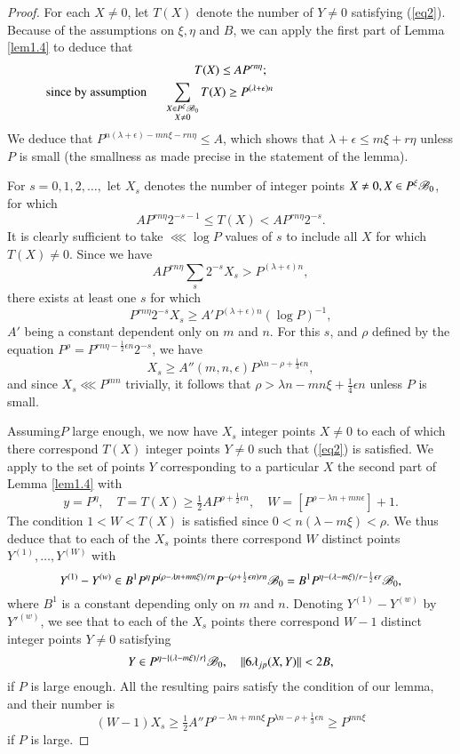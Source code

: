 \begin{proof}
For each $X\neq 0$, let $T(X)$ denote the number of $Y\neq 0$ 
satisfying (\ref{eq2}). Because of the assumptions on $\xi,\eta$ and 
$B$, we can apply the first part of Lemma \ref{lem1.4} to deduce that 
\begin{gather*}
T(X)\leq AP^{rn\eta};\\
\text{since by assumption}\hspace{.5cm} \sum_{\substack{X\in 
P^\xi\sB_0\\ X\neq 0}}T(X)\geq P^{(\lambda+\epsilon)n}\hspace{4cm}
\end{gather*}
We deduce that $P^{n(\lambda+\epsilon)-mn\xi-rn\eta}\leq A$, which 
shows that $\lambda+\epsilon\leq m\xi+r\eta$ unless $P$ is small (the 
smallness as made precise in the statement of the lemma).

For $s=0,1,2,\ldots,$ let $X_s$ denotes the number of integer points 
$X\neq 0,X\in P^\xi\mathscr{B}_0$, for which
$$
AP^{rn\eta}2^{-s-1}\leq T(X)<AP^{rn\eta}2^{-s}.
$$
It is clearly sufficient to take $\lll\log P$ values of $s$ to include 
all $X$ for which $T(X)\neq 0$. Since we have 
$$
AP^{rn\eta}\sum_s2^{-s}X_s>P^{(\lambda+\epsilon)n},
$$ 
there exists at least one $s$ for which
$$
P^{rn\eta}2^{-s}X_s\geq A'P^{(\lambda+\epsilon)n}(\log P)^{-1},
$$
$A'$ being a constant dependent only on $m$ and $n$. For this $s$, and 
$\rho$ defined by the equation $P^\rho =P^{rn\eta-\frac{1}{2}\epsilon 
n}2^{-s}$, we have 
$$
X_s\geq A''(m,n,\epsilon)P^{\lambda n-\rho+\frac{1}{3}\epsilon n},
$$
and since $X_s\lll P^{mn}$ trivially, it follows that $\rho>\lambda n- 
mn\xi+\frac{1}{4}\epsilon n$ unless $P$ is small.

Assuming\pageoriginale $P$ large enough, we now have $X_s$ integer 
points $X\neq 0$ to each of which there correspond $T(X)$ integer 
points $Y\neq 0$ such that (\ref{eq2}) is satisfied. We apply to the 
set of points $Y$ corresponding to a particular $X$ the second part of 
Lemma \ref{lem1.4} with 
$$
y=P^\eta,\quad T=T(X)\geq\tfrac{1}{2}AP^{\rho+\frac{1}{2}\epsilon 
n},\quad W=[P^{\rho-\lambda n+mn\epsilon}]+1.
$$ 
The condition $1<W<T(X)$ is satisfied since $0<n(\lambda-m\xi)<\rho$. 
We thus deduce that to each of the $X_s$ points there correspond $W$ 
distinct points $Y^{(1)},\ldots,Y^{(W)}$ with 
{\fontsize{10pt}{12pt}\selectfont
$$
 Y^{(1)}-Y^{(w)}\in B^1P^\eta P^{(\rho-\lambda n+mn\xi)/rn} P^{-(\rho+ 
\frac{1}{2}\epsilon n)rn}\mathscr{B}_0 =B^1P^{\eta-(\lambda-m\xi)/r- 
\frac{1}{2}\epsilon r}\mathscr{B}_0,
$$}
where $B^1$ is a constant depending only on $m$ and $n$. Denoting 
$Y^{(1)}-Y^{(w)}$ by ${Y'}^{(w)}$, we see that to each of the $X_s$ 
points there correspond $W-1$ distinct integer points $Y\neq 0$ 
satisfying
$$
Y\in P^{\eta-\left\{{(\lambda-m\xi)/r}\right\}}\mathscr{B}_0,\quad ||6\lambda_{jp}(X,Y)|| 
<2B,
$$
if $P$ is large enough. All the resulting pairs satisfy the condition 
of our lemma, and their number is 
$$
(W-1)X_s\geq\tfrac{1}{2}A'' P^{\rho-\lambda n+mn\xi}P^{\lambda n-\rho 
+\frac{1}{3}\epsilon n}\geq P^{mn\xi}
$$
if $P$ is large.
\end{proof}


